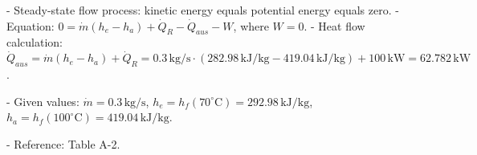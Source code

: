 - Steady-state flow process: kinetic energy equals potential energy equals zero.  
- Equation: \( 0 = \dot{m}(h_e - h_a) + \dot{Q}_R - \dot{Q}_{aus} - W \), where \( W = 0 \).  
- Heat flow calculation:  
  \( \dot{Q}_{aus} = \dot{m}(h_e - h_a) + \dot{Q}_R = 0.3 \, \text{kg/s} \cdot (282.98 \, \text{kJ/kg} - 419.04 \, \text{kJ/kg}) + 100 \, \text{kW} = 62.782 \, \text{kW} \).  

- Given values:  
  \( \dot{m} = 0.3 \, \text{kg/s} \),  
  \( h_e = h_f(70^\circ \text{C}) = 292.98 \, \text{kJ/kg} \),  
  \( h_a = h_f(100^\circ \text{C}) = 419.04 \, \text{kJ/kg} \).  

- Reference: Table A-2.